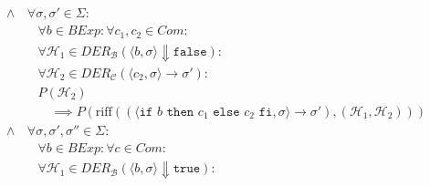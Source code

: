\begin{align*}
						\land             & \,\forall \sigma, \sigma' \in \Sigma : \tag{Zustände}                                                                                                                                                                                                     \\
						                  & \quad \forall b \in \textit{BExp} : \forall c _ 1, c _ 2 \in \textit{Com} : \tag{Ausdrucksbestandteile}                                                                                                                                                   \\
						                  & \quad \forall \mathcal{H} _ 1 \in \textit{DER} _ \mathcal{B} (\langle b, \sigma \rangle \Downarrow \texttt{false}) : \tag{Kalkülfremde Herleitungen}                                                                                                      \\
						                  & \quad \forall \mathcal{H} _ 2 \in \textit{DER} _ \mathcal{C} (\langle c _ 2, \sigma \rangle \rightarrow \sigma') : \tag{Herleitungen in Prämisse}                                                                                                         \\
						                  & \quad P(\mathcal{H} _ 2) \tag{Prämisse}                                                                                                                                                                                                                   \\
						                  & \quad\quad \implies P(\text{riff}((\langle \texttt{if } b \texttt{ then } c _ 1 \texttt{ else } c _ 2 \texttt{ fi}, \sigma \rangle \rightarrow \sigma'), (\mathcal{H} _ 1, \mathcal{H} _ 2))) \tag{Konklusion}                                            \\
						\land             & \,\forall \sigma, \sigma', \sigma'' \in \Sigma : \tag{Zustände}                                                                                                                                                                                           \\
						                  & \quad \forall b \in \textit{BExp} : \forall c \in \textit{Com} : \tag{Ausdrucksbestandteile}                                                                                                                                                              \\
						                  & \quad \forall \mathcal{H} _ 1 \in \textit{DER} _ \mathcal{B} (\langle b, \sigma \rangle \Downarrow \texttt{true}) : \tag{Kalkülfremde Herleitungen}                                                                                                       \\

\end{align*}
